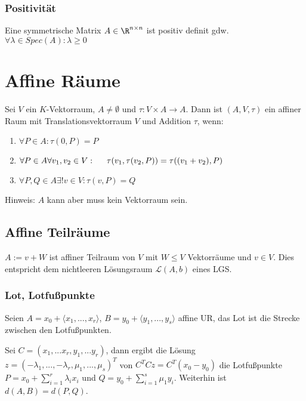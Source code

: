 \subsubsection*{Positivität}

Eine symmetrische Matrix $A \in \R^{n \times n}$ ist positiv definit gdw. $\forall \lambda \in Spec(A) : \lambda \geq 0$

\section*{Affine Räume}

Sei $V$ ein $K$-Vektorraum, $A \neq \emptyset$ und $\tau : V \times A \rightarrow A$. Dann ist $(A, V, \tau)$ ein affiner Raum  mit Translationsvektorraum $V$ und Addition $\tau$, wenn:

\begin{enumerate}[label=(\alph*)]
	\item $\forall P \in A : \tau(0, P) = P$
	\item $\forall P \in A \forall v_1, v_2 \in V : \\ \hspace*{5mm} \tau(v_1, \tau(v_2, P)) = \tau((v_1 + v_2), P)$
	\item $\forall P, Q \in A \exists ! v \in V : \tau(v, P) = Q$
\end{enumerate}

Hinweis: $A$ kann aber muss kein Vektorraum sein.

\subsection*{Affine Teilräume}

$A := v + W$ ist affiner Teilraum von $V$ mit $W \leq V$ Vektorräume und $v \in V$. Dies entspricht dem nichtleeren Lösungsraum $\mathcal{L}(A,b)$ eines LGS.

\subsubsection*{Lot, Lotfußpunkte}

Seien $A=x_0+\langle x_1,...,x_r \rangle$, $B=y_0+\langle y_1,...,y_s\rangle$ affine UR, das Lot ist die Strecke zwischen den Lotfußpunkten.

Sei $C=(x_1,...x_r,y_1,...y_r)$, dann ergibt die Lösung $z=(-\lambda_1,...,-\lambda_r,\mu_1,...,\mu_s)^T$ von $C^TCz=C^T(x_0-y_0)$ die Lotfußpunkte $P=x_0+\sum_{i=1}^r \lambda_i x_i$ und $Q=y_0+\sum_{i=1}^s \mu_1 y_i$. Weiterhin ist $d(A, B)=d(P,Q)$.

